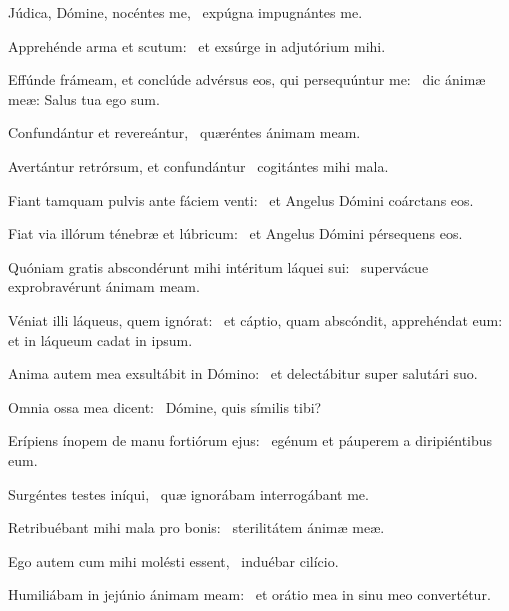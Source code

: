 \item Júdica, Dómine, nocéntes me,~\psstar{} expúgna impugnántes me.

\item Apprehénde arma et scutum:~\psstar{} et exsúrge in adjutórium mihi.

\item Effúnde frámeam, et conclúde advérsus eos, qui persequúntur me:~\psstar{} dic ánimæ meæ: Salus tua ego sum.

\item Confundántur et revereántur,~\psstar{} quæréntes ánimam meam.

\item Avertántur retrórsum, et confundántur~\psstar{} cogitántes mihi mala.

\item Fiant tamquam pulvis ante fáciem venti:~\psstar{} et Angelus Dómini coárctans eos.

\item Fiat via illórum ténebræ et lúbricum:~\psstar{} et Angelus Dómini pérsequens eos.

\item Quóniam gratis abscondérunt mihi intéritum láquei sui:~\psstar{} supervácue exprobravérunt ánimam meam.

\item Véniat illi láqueus, quem ignórat:~\pscross{} et cáptio, quam abscóndit, apprehéndat eum:~\psstar{} et in láqueum cadat in ipsum.

\item Anima autem mea exsultábit in Dómino:~\psstar{} et delectábitur super salutári suo.

\item Omnia ossa mea dicent:~\psstar{} Dómine, quis símilis tibi?

\item Erípiens ínopem de manu fortiórum ejus:~\psstar{} egénum et páuperem a diripiéntibus eum.

\item Surgéntes testes iníqui,~\psstar{} quæ ignorábam interrogábant me.

\item Retribuébant mihi mala pro bonis:~\psstar{} sterilitátem ánimæ meæ.

\item Ego autem cum mihi molésti essent,~\psstar{} induébar cilício.

\item Humiliábam in jejúnio ánimam meam:~\psstar{} et orátio mea in sinu meo convertétur.

